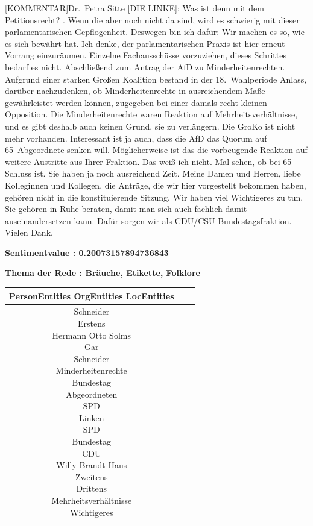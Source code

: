 \documentclass[a4paper,11pt]{article}
\begin{document}
[KOMMENTAR]Dr. Petra Sitte [DIE LINKE]: Was ist denn mit dem Petitionsrecht?
. Wenn die aber noch nicht da sind, wird es schwierig mit dieser parlamentarischen Gepflogenheit. Deswegen bin ich dafür: Wir machen es so, wie es sich bewährt hat. Ich denke, der parlamentarischen Praxis ist hier erneut Vorrang einzuräumen. Einzelne Fachausschüsse vorzuziehen, dieses Schrittes bedarf es nicht. Abschließend zum Antrag der AfD zu Minderheitenrechten. Aufgrund einer starken Großen Koalition bestand in der 18. Wahlperiode Anlass, darüber nachzudenken, ob Minderheitenrechte in ausreichendem Maße gewährleistet werden können, zugegeben bei einer damals recht kleinen Opposition. Die Minderheitenrechte waren Reaktion auf Mehrheitsverhältnisse, und es gibt deshalb auch keinen Grund, sie zu verlängern. Die ­GroKo ist nicht mehr vorhanden. Interessant ist ja auch, dass die AfD das Quorum auf 65 Abgeordnete senken will. Möglicherweise ist das die vorbeugende Reaktion auf weitere Austritte aus Ihrer Fraktion. Das weiß ich nicht. Mal sehen, ob bei 65 Schluss ist. Sie haben ja noch ausreichend Zeit. Meine Damen und Herren, liebe Kolleginnen und Kollegen, die Anträge, die wir hier vorgestellt bekommen haben, gehören nicht in die konstituierende Sitzung. Wir haben viel Wichtigeres zu tun. Sie gehören in Ruhe beraten, damit man sich auch fachlich damit auseinandersetzen kann. Dafür sorgen wir als CDU/CSU-Bundestagsfraktion. Vielen Dank.

\textbf{Sentimentvalue : 0.20073157894736843}

\textbf{Thema der Rede : Bräuche, Etikette, Folklore}
\vspace*{1cm}

\begin{table}[ht]
\centering
\begin{tabular}{||c | c | c||}
\hline
PersonEntities  OrgEntities  LocEntities \\ 

\hline\hline
\makecell{Schneider \\
Erstens \\
Hermann Otto Solms \\
Gar \\
Schneider \\
Minderheitenrechte \\
} 
\makecell{Bundestag \\
Abgeordneten \\
SPD \\
Linken \\
SPD \\
Bundestag \\
CDU \\
} 
\makecell{Willy-Brandt-Haus \\
Zweitens \\
Drittens \\
Mehrheitsverhältnisse \\
Wichtigeres \\
}\\
\hline
\end{tabular}
\end{table}
\clearpage
\end{document}
